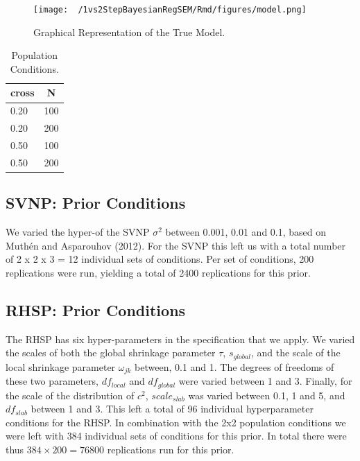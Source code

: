 \documentclass[
  man, donotrepeattitle,floatsintext]{apa6}
\begin{document}
\begin{figure}
\centering
\texttt{[image: ~/1vs2StepBayesianRegSEM/Rmd/figures/model.png]}
\caption{Graphical Representation of the True Model.}
\end{figure}

\begin{table}[tbp]

\begin{center}
\begin{threeparttable}

\caption{\label{tab:unnamed-chunk-2}Population Conditions.}

\begin{tabular}{ll}
\toprule
cross & \multicolumn{1}{c}{N}\\
\midrule
0.20 & 100\\
0.20 & 200\\
0.50 & 100\\
0.50 & 200\\
\bottomrule
\end{tabular}

\end{threeparttable}
\end{center}

\end{table}

\hypertarget{svnp-prior-conditions}{%
\subsection{SVNP: Prior Conditions}\label{svnp-prior-conditions}}

We varied the hyper-of the SVNP \(\sigma^2\) between 0.001, 0.01 and 0.1, based on Muthén and Asparouhov (2012). For the SVNP this left us with a total number of 2 x 2 x 3 = 12 individual sets of conditions. Per set of conditions, 200 replications were run, yielding a total of 2400 replications for this prior.

\hypertarget{rhsp-prior-conditions}{%
\subsection{RHSP: Prior Conditions}\label{rhsp-prior-conditions}}

The RHSP has six hyper-parameters in the specification that we apply. We varied the scales of both the global shrinkage parameter \(\tau\), \(s_{global}\), and the scale of the local shrinkage parameter \(\omega_{jk}\) between, 0.1 and 1. The degrees of freedoms of these two parameters, \(df_{local}\) and \(df_{global}\) were varied between 1 and 3. Finally, for the scale of the distribution of \(c^2\), \(scale_{slab}\) was varied between 0.1, 1 and 5, and \(df_{slab}\) between 1 and 3. This left a total of 96 individual hyperparameter conditions for the RHSP. In combination with the 2x2 population conditions we were left with 384 individual sets of conditions for this prior. In total there were thus \(384 \times 200 = 76800\) replications run for this prior.
\end{document}
